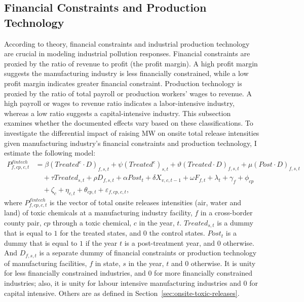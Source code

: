 \documentclass[12pt, english]{article}
\begin{document}
    \subsection{Financial Constraints and Production Technology}\label{subsec:financial-constraints-and-production-technology}
    According to theory, financial constraints and industrial production technology are crucial in modeling industrial pollution responses. Financial constraints are proxied by the ratio of revenue to profit (the profit margin). A high profit margin suggests the manufacturing industry is less financially constrained, while a low profit margin indicates greater financial constraint. Production technology is proxied by the ratio of total payroll or production workers' wages to revenue. A high payroll or wages to revenue ratio indicates a labor-intensive industry, whereas a low ratio suggests a capital-intensive industry. This subsection examines whether the documented effects vary based on these classifications. To investigate the differential impact of raising MW on onsite total release intensities given manufacturing industry's financial constraints and production technology, I estimate the following model:
    \begin{align}
        P_{f,cp,c,t}^{fintech} &= \beta (Treated^{e} \cdot D)_{f,s,t} + \psi (Treated^{e})_{s,t} + \vartheta (Treated \cdot D)_{f,s,t} + \mu (Post \cdot D)_{f,s,t} \nonumber \\
        &\quad + \tau Treated_{s,t} + \rho D_{f,s,t} + \alpha Post_{t} + \delta X_{v,c,t-1} + \omega F_{f,t} + \lambda_{t} + \gamma_{f} + \phi_{cp} \nonumber \\
        &\quad + \zeta_{c} + \eta_{c,t} + \theta_{cp,t} + \varepsilon_{f,cp,c,t},\label{eq:heterogeneous-onsite-releases-intensity-fintech}
    \end{align}
    where $P_{f,cp,c,t}^{fintech}$ is the vector of total onsite releases intensities (air, water and land) of toxic chemicals at a manufacturing industry facility, $f$ in a cross-border county pair, $cp$ through a toxic chemical, $c$ in the year, $t$. $Treated_{s,t}$ is a dummy that is equal to $1$ for the treated states, and $0$ the control states. $Post_{t}$ is a dummy that is equal to $1$ if the year $t$ is a post-treatment year, and $0$ otherwise. And $D_{f,s,t}$ is a separate dummy of financial constraints or production technology of manufacturing facilities, $f$ in state, $s$ in the year, $t$ and $0$ otherwise. It is unity for less financially constrained industries, and $0$ for more financially constrained industries; also, it is unity for labour intensive manufacturing industries and $0$ for capital intensive. Others are as defined in Section~\ref{sec:onsite-toxic-releases}.
\end{document}
